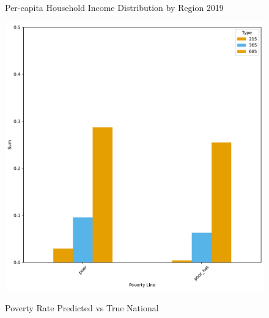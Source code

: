 \begin{figure}[H]
    \centering
    \caption{Per-capita Household Income Distribution by Region 2019}
    \label{fig:enter-label}
\end{figure}


\begin{figure}[H]
    \centering
    \caption{Poverty Rate Predicted vs True National}
    \includegraphics[width=\textwidth]{../figures/fig3_prediction_vs_true_poverty_rate_national.pdf}
    \label{fig:enter-label}
\end{figure}



